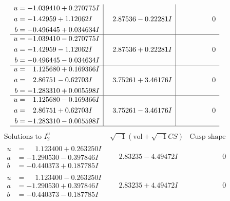 \documentclass[1p]{elsarticle_modified}
\theoremstyle{definition}
\newcommand{\I}{\sqrt{-1}}
\begin{document}
$$\begin{array}{c|c|c}
\begin{aligned}
u &= -1.039410 + 0.270775 I \\
a &= -1.42959 + 1.12062 I \\
b &= -0.496445 + 0.034634 I\end{aligned}
 & \phantom{-}2.87536 - 0.22281 I & \phantom{-0.000000 } 0 \\ \hline\begin{aligned}
u &= -1.039410 - 0.270775 I \\
a &= -1.42959 - 1.12062 I \\
b &= -0.496445 - 0.034634 I\end{aligned}
 & \phantom{-}2.87536 + 0.22281 I & \phantom{-0.000000 } 0 \\ \hline\begin{aligned}
u &= \phantom{-}1.125680 + 0.169366 I \\
a &= \phantom{-}2.86751 - 0.62703 I \\
b &= -1.283310 + 0.005598 I\end{aligned}
 & \phantom{-}3.75261 + 3.46176 I & \phantom{-0.000000 } 0 \\ \hline\begin{aligned}
u &= \phantom{-}1.125680 - 0.169366 I \\
a &= \phantom{-}2.86751 + 0.62703 I \\
b &= -1.283310 - 0.005598 I\end{aligned}
 & \phantom{-}3.75261 - 3.46176 I & \phantom{-0.000000 } 0\\
 \hline 
 \end{array}$$\newpage$$\begin{array}{c|c|c}  
\text{Solutions to }I^u_{2}& \I (\text{vol} + \sqrt{-1}CS) & \text{Cusp shape}\\
 \hline 
\begin{aligned}
u &= \phantom{-}1.123400 + 0.263250 I \\
a &= -1.290530 - 0.397846 I \\
b &= -0.440373 + 0.187785 I\end{aligned}
 & \phantom{-}2.83235 - 4.49472 I & \phantom{-0.000000 } 0 \\ \hline\begin{aligned}
u &= \phantom{-}1.123400 - 0.263250 I \\
a &= -1.290530 + 0.397846 I \\
b &= -0.440373 - 0.187785 I\end{aligned}
 & \phantom{-}2.83235 + 4.49472 I & \phantom{-0.000000 } 0 \\ \hline\begin{aligned}

\end{aligned}
\end{array}$$
\end{document}
